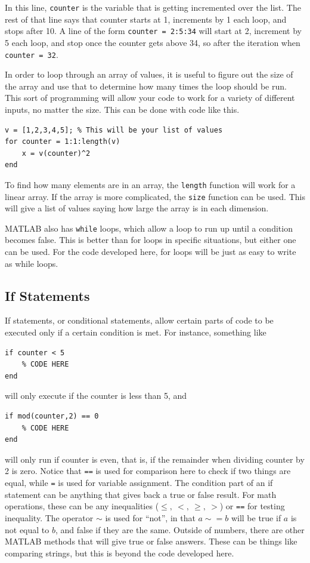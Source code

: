 \documentclass{ximera}
\begin{document}
In this line, \texttt{counter} is the variable that is getting incremented over the list. The rest of that line says that counter starts at 1, increments by 1 each loop, and stops after 10. A line of the form \texttt{counter = 2:5:34} will start at 2, increment by 5 each loop, and stop once the counter gets above 34, so after the iteration when \texttt{counter = 32}.

In order to loop through an array of values, it is useful to figure out the size of the array and use that to determine how many times the loop should be run. This sort of programming will allow your code to work for a variety of different inputs, no matter the size. This can be done with code like this.
\begin{verbatim}
v = [1,2,3,4,5]; % This will be your list of values
for counter = 1:1:length(v)
    x = v(counter)^2
end
\end{verbatim}

To find how many elements are in an array, the \texttt{length} function will work for a linear array. If the array is more complicated, the \texttt{size} function can be used. This will give a list of values saying how large the array is in each dimension.

MATLAB also has \texttt{while} loops, which allow a loop to run up until a condition becomes false. This is better than for loops in specific situations, but either one can be used. For the code developed here, for loops will be just as easy to write as while loops. 

\subsection{If Statements}
If statements, or conditional statements, allow certain parts of code to be executed only if a certain condition is met. For instance, something like
\begin{verbatim}
if counter < 5
    % CODE HERE
end
\end{verbatim}
will only execute if the counter is less than 5, and
\begin{verbatim}
if mod(counter,2) == 0
    % CODE HERE
end
\end{verbatim}
will only run if counter is even, that is, if the remainder when dividing counter by 2 is zero. Notice that \texttt{==} is used for comparison here to check if two things are equal, while \texttt{=} is used for variable assignment. The condition part of an if statement can be anything that gives back a true or false result. For math operations, these can be any inequalities ($\leq, \ <,\ \geq, \ >$) or \texttt{==} for testing inequality. The operator $\sim$ is used for ``not'', in that $a \sim= b$ will be true if $a$ is not equal to $b$, and false if they are the same. Outside of numbers, there are other MATLAB methods that will give true or false answers. These can be things like comparing strings, but this is beyond the code developed here.  
\end{document}
